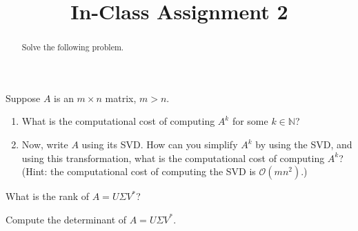 \documentclass{ximera}
\begin{document}
    \title{In-Class Assignment 2}
    
    \begin{abstract} Solve the following problem.
    \end{abstract}
    \maketitle

\begin{exercise}
    Suppose $A$ is an $m \times n$ matrix, $m >n$.  
    \begin{enumerate}
        \item What is the computational cost of computing $A^k$ for some $k \in \mathbb{N}$?
        \item Now, write $A$ using its SVD.  How can you simplify $A^k$ by using the SVD, and using this transformation, what is the computational cost of computing $A^k$? (Hint: the computational cost of computing the SVD is $\mathcal{O}(mn^2)$.)
    \end{enumerate}
\end{exercise}

\begin{exercise}
    What is the rank of $A = U\Sigma V^*$?
\end{exercise}

\begin{exercise}
    Compute the determinant of $A = U\Sigma V^*$.
\end{exercise}
\end{document}
